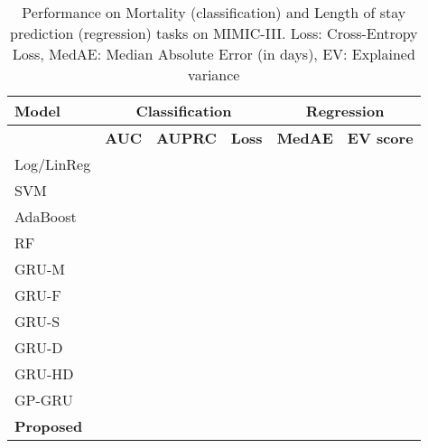 \documentclass{article} \usepackage{iclr2019_conference,times}
\begin{document}
\begin{table}[h]
\caption{Performance on Mortality (classification) and Length of stay prediction (regression) tasks on MIMIC-III. Loss: Cross-Entropy Loss, MedAE: Median Absolute Error (in days), EV: Explained variance}
\footnotesize
\begin{center}
\begin{tabular}{ l c c c c c} 
 \toprule
 {\bf Model}&  \multicolumn{3}{c}{\bf Classification} &  \multicolumn{2}{c}{\bf Regression}\\
 \midrule
 {} & {\bf AUC} & {\bf AUPRC} & {\bf Loss} & {\bf MedAE} & {\bf EV score}\\
  \midrule
 {Log/LinReg} &  &   &   & &	\\ 
  {SVM} &  & & &	&	\\ 
 
  AdaBoost & & 	& &	& 	\\ 
 
  RF &  &	&	 &	&	  \\ 
 
  GRU-M &  & 	&	 &	&	\\ 
 
 GRU-F &  &  &		 &	& 	 \\
 
  GRU-S &  & 	 &		  &	&	\\ 

 GRU-D &  & 	&	 &  &	\\
 GRU-HD &  &  &  &  &	 \\ 
GP-GRU &  &  &  &  &  \\
 {\bf Proposed } &   &	&	   &  & \\ 
\bottomrule
 \end{tabular}
\end{center}
\label{table:1}
\end{table} 
\end{document}
